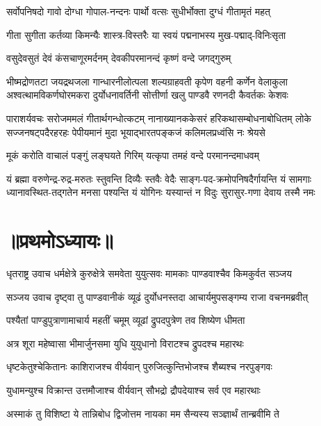 \twolineshloka
{सर्वोपनिषदो गावो दोग्धा गोपाल-नन्दनः}
{पार्थो वत्सः सुधीर्भोक्ता दुग्धं गीतामृतं महत्}%

\twolineshloka
{गीता सुगीता कर्तव्या किमन्यैः शास्त्र-विस्तरैः}
{या स्वयं पद्मनाभस्य मुख-पद्माद्-विनिःसृता}%

\twolineshloka
{वसुदेवसुतं देवं कंसचाणूरमर्दनम्}
{देवकीपरमानन्दं कृष्णं वन्दे जगद्गुरुम्}%

\fourlineindentedshloka
{भीष्मद्रोणतटा जयद्रथजला गान्धारनीलोत्पला}
{शल्यग्राहवती कृपेण वहनी कर्णेन वेलाकुला}
{अश्वत्थामविकर्णघोरमकरा दुर्योधनावर्तिनी}
{सोत्तीर्णा खलु पाण्डवै रणनदी कैवर्तकः केशवः}%

\fourlineindentedshloka
{पाराशर्यवचः सरोजममलं गीतार्थगन्धोत्कटम्}
{नानाख्यानककेसरं हरिकथासम्बोधनाबोधितम्}
{लोके सज्जनषट्‌पदैरहरहः पेपीयमानं मुदा}
{भूयाद्भारतपङ्कजं कलिमलप्रध्वंसि नः श्रेयसे}%

\twolineshloka
{मूकं करोति वाचालं पङ्गुं लङ्घयते गिरिम्}
{यत्कृपा तमहं वन्दे परमानन्दमाधवम्}%

\fourlineindentedshloka
{यं ब्रह्मा वरुणेन्द्र-रुद्र-मरुतः स्तुवन्ति दिव्यैः स्तवैः}
{वेदैः साङ्ग-पद-क्रमोपनिषदैर्गायन्ति यं सामगाः}
{ध्यानावस्थित-तद्गतेन मनसा पश्यन्ति यं योगिनः}
{यस्यान्तं न विदुः सुरासुर-गणा देवाय तस्मै नमः}%

\resetShloka
\section{॥प्रथमोऽध्यायः॥}%
{धृतराष्ट्र उवाच}
\twolineshloka
{धर्मक्षेत्रे कुरुक्षेत्रे समवेता युयुत्सवः}
{मामकाः पाण्डवाश्चैव किमकुर्वत सञ्जय}%

{सञ्जय उवाच}
\twolineshloka
{दृष्ट्वा तु पाण्डवानीकं व्यूढं दुर्योधनस्तदा}
{आचार्यमुपसङ्गम्य राजा वचनमब्रवीत्}%

\twolineshloka
{पश्यैतां पाण्डुपुत्राणामाचार्य महतीं चमूम्}
{व्यूढां द्रुपदपुत्रेण तव शिष्येण धीमता}%

\twolineshloka
{अत्र शूरा महेष्वासा भीमार्जुनसमा युधि}
{युयुधानो विराटश्च द्रुपदश्च महारथः}%

\twolineshloka
{धृष्टकेतुश्चेकितानः काशिराजश्च वीर्यवान्}
{पुरुजित्कुन्तिभोजश्च शैब्यश्च नरपुङ्गवः}%

\twolineshloka
{युधामन्युश्च विक्रान्त उत्तमौजाश्च वीर्यवान्}
{सौभद्रो द्रौपदेयाश्च सर्व एव महारथाः}%

\twolineshloka
{अस्माकं तु विशिष्टा ये तान्निबोध द्विजोत्तम}
{नायका मम सैन्यस्य सञ्ज्ञार्थं तान्ब्रवीमि ते}%


